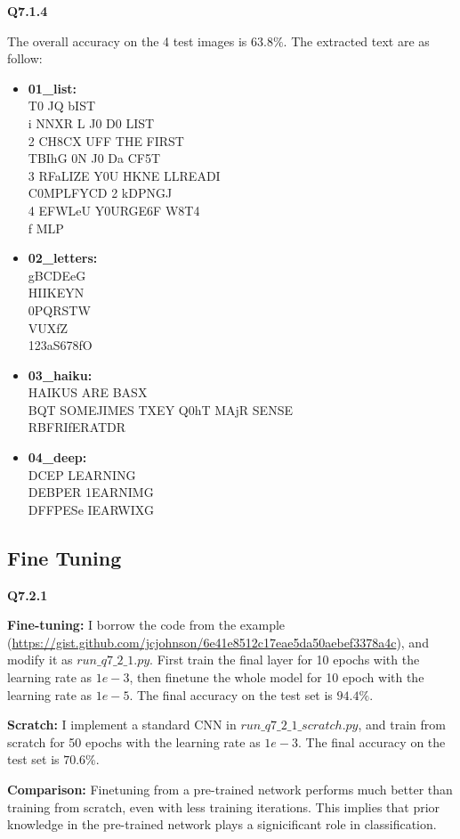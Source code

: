 \documentclass[
  course = {{16-720B Computer Vision}},
  quartile = {{1}},
  assignment = 3-Neural\ Networks\ for\ Recognition,
  name = {{Kangle Deng}},
  email = {{kangled@andrew.cmu.edu}},
  firstexercise = 1
]{aga-homework}
\begin{document}
\noindent \textbf{Q7.1.4}

The overall accuracy on the 4 test images is $63.8\%$. The extracted text are as follow:

\begin{itemize}
    \item \textbf{01\_list:} \\ 
    T0 JQ bIST \\
    i NNXR L J0 D0 LIST \\
    2 CH8CX UFF THE FIRST \\
    TBIhG 0N J0 Da CF5T\\
    3 RFaLIZE Y0U HKNE LLREADI\\
    C0MPLFYCD 2 kDPNGJ\\
    4 EFWLeU Y0URGE6F W8T4\\
    f MLP
    \item \textbf{02\_letters:} \\ gBCDEeG \\
    HIIKEYN \\
    0PQRSTW \\
    VUXfZ \\
    123aS678fO
    \item \textbf{03\_haiku:}\\ 
    HAIKUS ARE BASX\\
    BQT SOMEJIMES TXEY Q0hT MAjR SENSE\\
    RBFRIfERATDR
    \item \textbf{04\_deep:} \\ DCEP LEARNING\\DEBPER 1EARNIMG\\DFFPESe IEARWIXG
    
\end{itemize}

\subsection{Fine Tuning}
\noindent\textbf{Q7.2.1}

\noindent \textbf{Fine-tuning: } I borrow the code from the example (\url{https://gist.github.com/jcjohnson/6e41e8512c17eae5da50aebef3378a4c}), and modify it as $run\_q7\_2\_1.py$. First train the final layer for 10 epochs with the learning rate as $1e-3$, then finetune the whole model for 10 epoch with the learning rate as $1e-5$. The final accuracy on the test set is $94.4\%$.

\noindent \textbf{Scratch: } I implement a standard CNN in $run\_q7\_2\_1\_scratch.py$, and train from scratch for 50 epochs with the learning rate as $1e-3$. The final accuracy on the test set is $70.6\%$.

\noindent \textbf{Comparison: } Finetuning from a pre-trained network performs much better than training from scratch, even with less training iterations. This implies that prior knowledge in the pre-trained network plays a signicificant role in classification.
\end{document}

